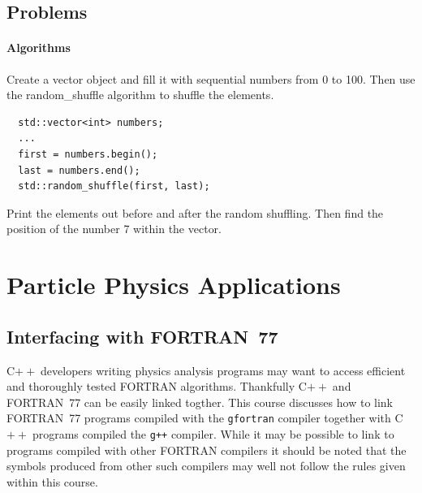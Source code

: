 \documentclass[11pt,a4paper]{scrartcl}
\def\cpp{C$++\;$}
\begin{document}

\subsection{Problems}

\paragraph{Algorithms}
Create a vector object and fill it with sequential numbers from 0 to
100.  Then use the random\_shuffle algorithm to shuffle the elements.
\begin{verbatim}
  std::vector<int> numbers;
  ...
  first = numbers.begin();
  last = numbers.end();
  std::random_shuffle(first, last);
\end{verbatim}
Print the elements out before and after the random shuffling.  Then
find the position of the number 7 within the vector.


\section{Particle Physics Applications \label{section:apps}}


\subsection{Interfacing with FORTRAN~77}

\cpp developers writing physics analysis programs may
want to access efficient and thoroughly tested FORTRAN algorithms.
Thankfully \cpp and FORTRAN~77 can be easily linked togther.  This
course discusses how to link FORTRAN~77 programs compiled with the
\texttt{gfortran} compiler together with \cpp programs compiled the
\texttt{g++} compiler.  While it may be possible to link to programs
compiled with other FORTRAN compilers it should be noted that the
symbols produced from other such compilers may well not follow the
rules given within this course.
\end{document}
